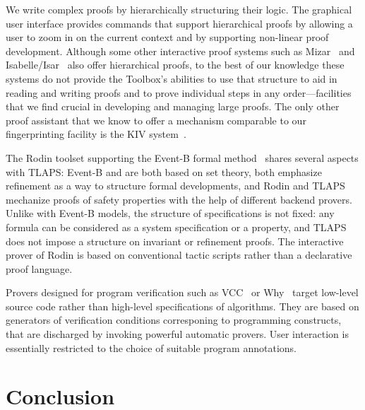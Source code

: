 \documentclass[a4paper,draft]{llncs}
\begin{document}
We write complex proofs by hierarchically structuring their logic. 
The graphical user interface provides commands that support hierarchical proofs
by allowing a user to zoom in on the current context and by supporting
non-linear proof development. Although some other interactive proof systems such
as Mizar~\cite{trybulec:mizar} and Isabelle/Isar~\cite{wenzel:isar} also offer
hierarchical proofs, to the best of our knowledge these systems do not provide
the Toolbox's abilities to use that structure to aid in reading and writing
proofs and to prove individual steps in any order---facilities that we find
crucial in developing and managing large proofs. The only other proof
assistant that we know to offer a mechanism comparable to our fingerprinting
facility is the KIV system~\cite{balser:kiv}.

The Rodin toolset supporting the Event-B formal method~\cite{abrial:rodin}
shares several aspects with TLAPS: 
Event-B and \tlaplus are both based on set theory, both
emphasize refinement as a way to structure formal developments, and Rodin and
TLAPS mechanize proofs of safety properties with the help of different backend
provers. Unlike with Event-B models, the structure of \tlaplus specifications is
not fixed: any \tlaplus formula can be considered as a system specification or a
property, and TLAPS does not impose a structure on invariant or refinement
proofs. The interactive prover of Rodin is based on conventional tactic scripts
rather than a declarative proof language.

Provers designed for program verification such as VCC~\cite{cohen:vcc} or
Why~\cite{herms:certified} target low-level source code rather
than high-level specifications of algorithms. They are based on generators of
verification conditions corresponing to programming constructs, that are
discharged by invoking powerful automatic provers. User interaction is
essentially restricted to the choice of suitable program annotations.



\section{Conclusion}
\label{sec:conclusion}
\end{document}
